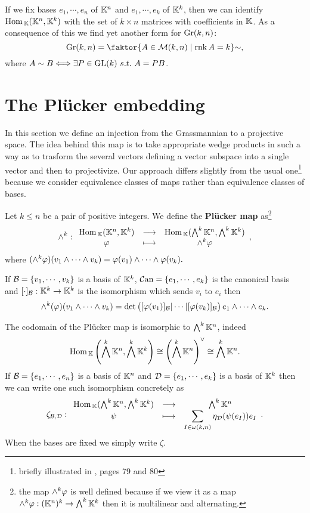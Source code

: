 \begin{remark}
If we fix bases $e_1,\cdots, e_n$ of $\mathbb{K}^n$ and $e_1,\cdots, e_k$ of $\mathbb{K}^k$, then we can identify $\mathrm{Hom}\,_{\mathbb{K}}(\mathbb{K}^n,\mathbb{K}^k)$ with the set of $k\times n$ matrices with coefficients in $\mathbb{K}$. As a consequence of this we find yet another form for $\mathrm{Gr}(k,n)$:
\[\Gr(k,n)=\quot{\cpa{A\in \Mc(k,n)\mid \rnk A=k}}{\sim},\] 
where $A\sim B\Longleftrightarrow \exists P\in \mathrm{GL}(k)\ s.t.\ A=PB$.
\end{remark}

\section{The Pl\"ucker embedding}
In this section we define an injection from the Grassmannian to a projective space.
The idea behind this map is to take appropriate wedge products in such a way as to trasform the several vectors defining a vector subspace into a single vector and then to projectivize. 
Our approach differs slightly from the usual one\footnote{briefly illustrated in \cite{matroids}, pages 79 and 80} because we consider equivalence classes of maps rather than equivalence classes of bases.

\begin{definition}
Let $k\leq n$ be a pair of positive integers. We define the \textbf{Pl\"ucker map} as\footnote{the map $\wedge^k\varphi$ is well defined because if we view it as a map $\wedge^k\varphi:(\mathbb{K}^n)^k\to \bigwedge^k\mathbb{K}^k$ then it is multilinear and alternating.}
\[\wedge^k:\begin{array}{ccc} {\mathrm{Hom}\,_{\mathbb{K}}(\mathbb{K}^n,\mathbb{K}^k)} & \longrightarrow & {\mathrm{Hom}\,_{\mathbb{K}}(\bigwedge^k\mathbb{K}^n,\bigwedge^k\mathbb{K}^k)}\\ {\varphi} & \longmapsto & {\wedge^k\varphi} \end{array},\]
where $(\wedge^k\varphi)(v_1\wedge\cdots\wedge v_k)=\varphi(v_1)\wedge\cdots\wedge\varphi(v_k).$
\end{definition}

\begin{remark}
If $\mathcal{B}=\left\{{v_1,\cdots, v_k}\right\}$ is a basis of $\mathbb{K}^k$, ${\mathcal{C}\mathrm{an}}=\left\{{e_1,\cdots,e_k}\right\}$ is the canonical basis and $[\cdot]_{\mathcal{B}}:\mathbb{K}^k\to\mathbb{K}^k$ is the isomorphism which sends $v_i$ to $e_i$ then
\[\wedge^k(\varphi)(v_1\wedge\cdots\wedge v_k)=\det\begin{pmatrix}[\varphi(v_1)]_{\mathcal{B}}|\cdots|[\varphi(v_k)]_{\mathcal{B}}\end{pmatrix} e_1\wedge\cdots\wedge e_k.\]
\end{remark}

\begin{remark}\label{CodomainOfPluckerMap}
The codomain of the Pl\"ucker map is isomorphic to $\bigwedge^k\mathbb{K}^n$, indeed
\[\mathrm{Hom}\,_{\mathbb{K}}\left({\bigwedge^k\mathbb{K}^n,\bigwedge^k\mathbb{K}^k}\right)\cong \left({\bigwedge^k\mathbb{K}^n}\right)^{\vee}\cong \bigwedge^k\mathbb{K}^n.\]
If $\mathcal{B}=\left\{{e_1,\cdots, e_n}\right\}$ is a basis of $\mathbb{K}^n$ and $\mathcal{D}=\left\{{e_1,\cdots, e_k}\right\}$ is a basis of $\mathbb{K}^k$ then we can write one such isomorphism concretely as
\[\zeta_{\mathcal{B},\mathcal{D}}:\begin{array}{ccc} {\mathrm{Hom}\,_{\mathbb{K}}(\bigwedge^k\mathbb{K}^n,\bigwedge^k\mathbb{K}^k)} & \longrightarrow & {\bigwedge^k\mathbb{K}^n}\\ {\psi} & \longmapsto & {\displaystyle\sum_{I\in\omega(k,n)} \eta_{\mathcal{D}}(\psi(e_I))e_I} \end{array}.\]
When the bases are fixed we simply write $\zeta$.
\end{remark}

